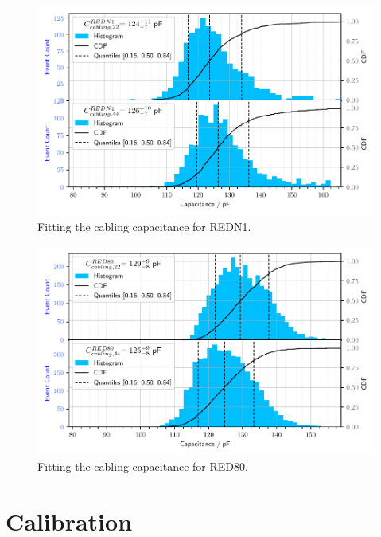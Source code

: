 \begin{figure}
\centering
\includegraphics[scale=1]{Figures/ElectrodesExperimental/redn1_cabling_capacitance_fitting.pdf}
\caption{Fitting the cabling capacitance for REDN1.}
\label{fig:red80-cabling-capacitance}
\end{figure}


\begin{figure}
\centering
\includegraphics[scale=1]{Figures/ElectrodesExperimental/red80_cabling_capacitance_fitting.pdf}
\caption{Fitting the cabling capacitance for RED80.}
\label{fig:red80-cabling-capacitance}
\end{figure}


\section{Calibration}
\label{par:calibration}

